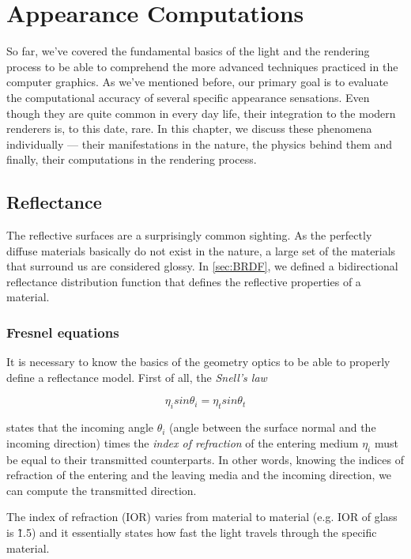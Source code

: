 \chapter{Appearance Computations}
\label{chap:appearance}

So far, we've covered the fundamental basics of the light and the rendering process to be able to comprehend the more advanced techniques practiced in the computer graphics. As we've mentioned before, our primary goal is to evaluate the computational accuracy of several specific appearance sensations. Even though they are quite common in every day life, their integration to the modern renderers is, to this date, rare.  In this chapter, we discuss these phenomena individually --- their manifestations in the nature, the physics behind them and finally, their computations in the rendering process. 

\section{Reflectance}

The reflective surfaces are a surprisingly common sighting. As the perfectly diffuse materials basically do not exist in the nature, a large set of the materials that surround us are considered glossy. In \autoref{sec:BRDF}, we defined a bidirectional reflectance distribution function that defines the reflective properties of a material. 

\subsection{Fresnel equations}

It is necessary to know the basics of the geometry optics to be able to properly define a reflectance model. First of all, the \emph{Snell's law}~\cite{pharr2016physically}

\begin{equation}
\eta_i sin\theta_i = \eta_t sin\theta_t 
\end{equation}

states that the incoming angle $\theta_i$ (angle between the surface normal and the incoming direction) times the \emph{index of refraction} of the entering medium $\eta_i$ must be equal to their transmitted counterparts. In other words, knowing the indices of refraction of the entering and the leaving media and the incoming direction, we can compute the transmitted direction.

The index of refraction (IOR) varies from material to material (e.g. IOR of glass is \~1.5) and it essentially states how fast the light travels through the specific material.

